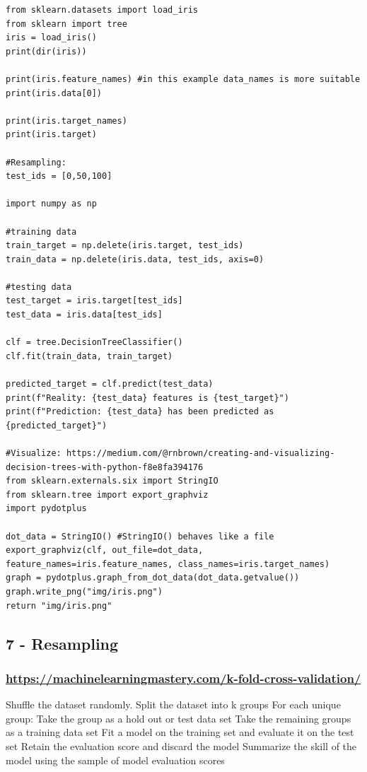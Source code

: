 \documentclass[11pt]{article}
\begin{document}
\begin{verbatim}
from sklearn.datasets import load_iris
from sklearn import tree
iris = load_iris()
print(dir(iris))

print(iris.feature_names) #in this example data_names is more suitable
print(iris.data[0])

print(iris.target_names)
print(iris.target)

#Resampling:
test_ids = [0,50,100]

import numpy as np

#training data
train_target = np.delete(iris.target, test_ids)
train_data = np.delete(iris.data, test_ids, axis=0)

#testing data
test_target = iris.target[test_ids]
test_data = iris.data[test_ids]

clf = tree.DecisionTreeClassifier()
clf.fit(train_data, train_target)

predicted_target = clf.predict(test_data)
print(f"Reality: {test_data} features is {test_target}")
print(f"Prediction: {test_data} has been predicted as {predicted_target}")

#Visualize: https://medium.com/@rnbrown/creating-and-visualizing-decision-trees-with-python-f8e8fa394176
from sklearn.externals.six import StringIO  
from sklearn.tree import export_graphviz
import pydotplus

dot_data = StringIO() #StringIO() behaves like a file
export_graphviz(clf, out_file=dot_data, feature_names=iris.feature_names, class_names=iris.target_names)
graph = pydotplus.graph_from_dot_data(dot_data.getvalue())  
graph.write_png("img/iris.png")
return "img/iris.png"
\end{verbatim}




\subsection{7 - Resampling}
\label{sec:orgc1a0851}

\subsubsection{\url{https://machinelearningmastery.com/k-fold-cross-validation/}}
\label{sec:orgd1be5c1}
Shuffle the dataset randomly.
Split the dataset into k groups
For each unique group:
Take the group as a hold out or test data set
Take the remaining groups as a training data set
Fit a model on the training set and evaluate it on the test set
Retain the evaluation score and discard the model
Summarize the skill of the model using the sample of model evaluation scores
\end{document}
